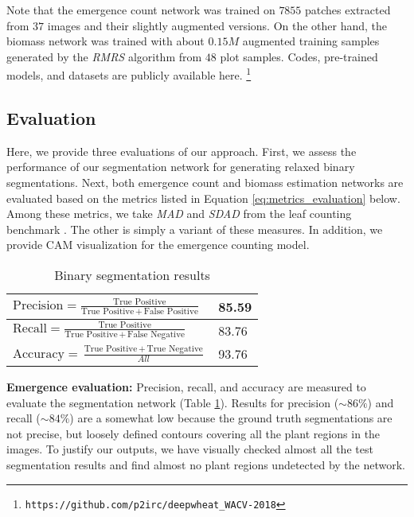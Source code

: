 \documentclass[10pt,twocolumn,letterpaper]{article}
\begin{document}
Note that the emergence count network was trained on $7855$ patches extracted from $37$ images and their slightly augmented versions. On the other hand, the biomass network was trained with about $0.15M$ augmented training samples generated by the \textit{RMRS} algorithm from $48$ plot samples. Codes, pre-trained models, and datasets are publicly available here. \footnote{\texttt{https://github.com/p2irc/deepwheat\_WACV{-}2018}}%

\subsection{Evaluation}

Here, we provide three evaluations of our approach. First, we assess the performance of our segmentation network for generating relaxed binary segmentations. Next, both emergence count and biomass estimation networks are evaluated based on the metrics listed in Equation \ref{eq:metrics_evaluation} below. Among these metrics, we take \textit{MAD} and \textit{SDAD} from the leaf counting benchmark \cite{aich-cvppp2017}. The other is simply a variant of these measures. In addition, we provide CAM visualization for the emergence counting model.

\begin{table}[!htbp]
\centering
{\renewcommand{\arraystretch}{1.5}
\begin{tabular}{|l|l|}
\hline
$\text{Precision} = \frac{\text{True Positive}}{\text{True Positive} \, + \, \text{False Positive} }$ & 85.59 \\ \hline
$\text{Recall} = \frac{\text{True Positive}}{\text{True Positive} \, + \, \text{False Negative}}$ & 83.76 \\ \hline
$\text{Accuracy} = \frac{\text{True Positive} \, + \, \text{True Negative}}{\textit{All}}$ & 93.76 \\ \hline
\end{tabular} }
\caption{Binary segmentation results}
\label{tab:binseg}
\end{table}

\textbf{Emergence evaluation: } Precision, recall, and accuracy are measured to evaluate the segmentation network (Table \ref{tab:binseg}). Results for precision ($\sim86\%$) and recall ($\sim84\%$) are a somewhat low because the ground truth segmentations are not precise, but loosely defined contours covering all the plant regions in the images. To justify our outputs, we have visually checked almost all the test segmentation results and find almost no plant regions undetected by the network.
\end{document}
